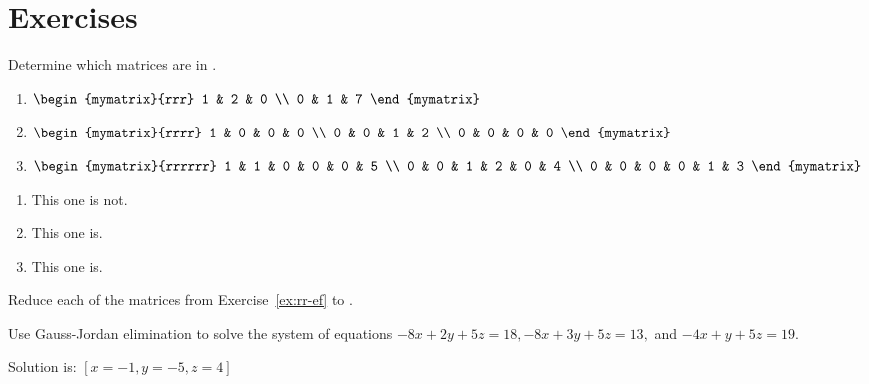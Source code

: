 \section*{Exercises}

\begin{enumialphparenastyle}

\begin{ex} Determine which matrices are in {\rref}. 

\begin{enumerate}
\item $\begin{mymatrix}{rrr}
1 & 2 & 0 \\
0 & 1 & 7
\end{mymatrix} $

\item $\begin{mymatrix}{rrrr}
1 & 0 & 0 & 0 \\
0 & 0 & 1 & 2 \\
0 & 0 & 0 & 0
\end{mymatrix} $

\item $\begin{mymatrix}{rrrrrr}
1 & 1 & 0 & 0 & 0 & 5 \\
0 & 0 & 1 & 2 & 0 & 4 \\
0 & 0 & 0 & 0 & 1 & 3
\end{mymatrix} $
\end{enumerate}
\begin{sol}
\begin{enumerate}
\item This one is not.
\item This one is.
\item This one is.
\end{enumerate}
\end{sol}
\end{ex}

\begin{ex}
 Reduce each of the matrices from Exercise~\ref{ex:rr-ef} to {\rref}.
\end{ex}

\begin{ex} Use Gauss-Jordan elimination to solve the system of equations
$-8x+2y+5z=18,-8x+3y+5z=13,$ and $-4x+y+5z=19.$
\begin{sol}
 Solution is: $\left[x=-1,y=-5,z=4\right] $
\end{sol}
\end{ex}


\end{enumialphparenastyle}
